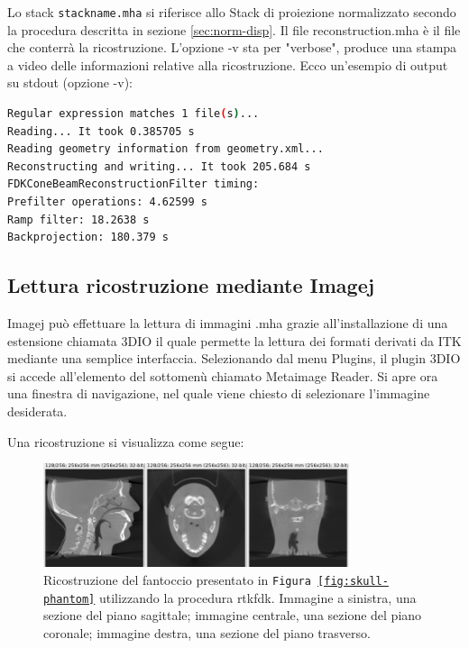 \documentclass[a4paper,12pt, doubleside]{report}
\begin{document}
                    Lo stack \texttt{stack\textunderscore name.mha} si riferisce allo Stack di proiezione normalizzato secondo la procedura descritta in sezione \ref{sec:norm-disp}. Il file reconstruction.mha è il file che conterrà la ricostruzione. L'opzione -v sta per "verbose", produce una stampa a video delle informazioni relative alla ricostruzione.
                    Ecco un'esempio di output su stdout (opzione -v):
                    \begin{lstlisting}[language=bash, frame=bt]
Regular expression matches 1 file(s)...
Reading... It took 0.385705 s
Reading geometry information from geometry.xml...
Reconstructing and writing... It took 205.684 s
FDKConeBeamReconstructionFilter timing:
Prefilter operations: 4.62599 s
Ramp filter: 18.2638 s
Backprojection: 180.379 s
                    \end{lstlisting}
            \subsection{Lettura ricostruzione mediante Imagej}
                \par
                    Imagej può effettuare la lettura di immagini .mha grazie all'installazione di una estensione chiamata 3DIO\cite{imagej-3dio-plugin} il quale permette la lettura dei formati derivati da ITK mediante una semplice interfaccia.
                    Selezionando dal menu Plugins, il plugin 3DIO si accede all'elemento del sottomenù chiamato Metaimage Reader. Si apre ora una finestra di navigazione, nel quale viene chiesto di selezionare l'immagine desiderata.
                    
                    Una ricostruzione si visualizza come segue:
                    
                    \begin{figure}[h]
                        
                        \centering
                        \includegraphics[width=0.8\textwidth]{reconstruction}
                        \caption{Ricostruzione del fantoccio presentato in \texttt{Figura \ref{fig:skull-phantom}}
                        utilizzando la procedura rtkfdk. Immagine a sinistra, una sezione del piano sagittale; immagine centrale, una sezione del piano coronale; immagine destra, una sezione del piano trasverso. }
                        \label{fig:reconstruction}
                        
                    \end{figure}
            
\end{document}
